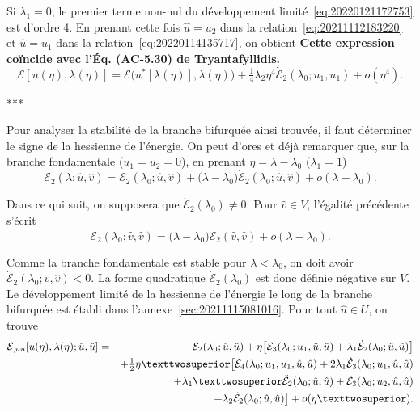 \documentclass[12pt, final]{amsart}
\begin{document}
Si \(\lambda _1=0\), le premier terme non-nul du développement
limité~\eqref{eq:20220121172753} est d'ordre 4. En prenant cette fois
\(\hat{u}=u_2\) dans la relation~\eqref{eq:20211112183220} et \(\hat{u}=u_1\)
dans la relation~\eqref{eq:20220114135717}, on obtient \textbf{Cette
  expression coïncide avec l'Éq. (AC-5.30) de Tryantafyllidis.}
\begin{equation}
  \mathcal E[u(\eta ), \lambda (\eta )]=\mathcal E\bigl(u^*[\lambda (\eta )], \lambda (\eta )\bigr)+\tfrac1{4}\lambda _2\eta ^4\dot{\mathcal E}_2(\lambda _0; u_1, u_1)+o(\eta ^4).
\end{equation}

\begin{center}
  ***
\end{center}

Pour analyser la stabilité de la branche bifurquée ainsi trouvée, il faut
déterminer le signe de la hessienne de l'énergie. On peut d'ores et déjà
remarquer que, sur la branche fondamentale (\(u_1=u_2=0\)), en prenant \(\eta =\lambda -\lambda _0\)
(\(\lambda _1=1\))
\begin{equation}
  \mathcal E_2(\lambda ; \hat{u}, \hat{v})
  =\mathcal E_2(\lambda _0; \hat{u}, \hat{v})+\bigl(\lambda -\lambda _0\bigr)\dot{\mathcal E}_2(\lambda _0; \hat{u}, \hat{v})+o(\lambda -\lambda _0).
\end{equation}

Dans ce qui suit, on supposera que \(\dot{\mathcal E}_2(\lambda _0)\neq0\). Pour \(\hat{v}\in V\),
l'égalité précédente s'écrit
\begin{equation}
  \mathcal E_2(\lambda _0; \hat{v}, \hat{v})=\bigl(\lambda -\lambda _0\bigr)\dot{\mathcal E}_2(\hat{v}, \hat{v})+o(\lambda -\lambda _0).
\end{equation}

Comme la branche fondamentale est stable pour \(\lambda <\lambda _0\), on doit avoir
\(\dot{\mathcal E}_2(\lambda _0; \hat{v}, \hat{v})<0\). La forme quadratique \(\dot{\mathcal E}_2(\lambda _0)\) est
donc définie négative sur \(V\). Le développement limité de la hessienne de
l'énergie le long de la branche bifurquée est établi dans
l'annexe~\ref{sec:20211115081016}. Pour tout \(\hat{u}\in U\), on trouve
\begin{eqnarray}
  \notag
  \mathcal E_{,uu}[u(\eta ), \lambda (\eta ); \hat{u}, \hat{u}]
  &=&\mathcal E_2(\lambda _0; \hat{u}, \hat{u})+\eta \bigl[\mathcal E_3(\lambda _0; u_1, \hat{u}, \hat{u})
      +\lambda _1\dot{\mathcal E}_2(\lambda _0; \hat{u}, \hat{u})\bigr]\\
  \notag
  &&+\tfrac12\eta ²\bigl[\mathcal E_4(\lambda _0; u_1, u_1, \hat{u}, \hat{u})
     +2\lambda _1\dot{\mathcal E}_3(\lambda _0; u_1, \hat{u}, \hat{u})\\
  \notag
  &&+\lambda _1²\ddot{\mathcal E}_2(\lambda _0; \hat{u}, \hat{u})
     +\mathcal E_3(\lambda _0; u_2, \hat{u}, \hat{u})\\
  \label{eq:20211115082025}
  &&+\lambda _2\dot{\mathcal E}_2(\lambda _0; \hat{u}, \hat{u})\bigr]+o(\eta ²).
\end{eqnarray}
\end{document}
